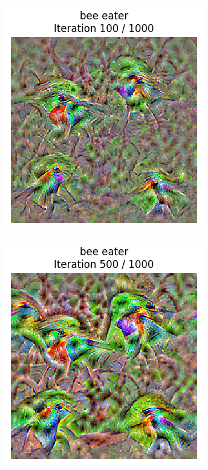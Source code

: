 \begin{figure}[H]
    \centering
    \begin{subfigure}[t]{.25\textwidth}
        \centering
        \includegraphics[width=\linewidth]{SqueezeNet/bird_animated_1000_regpp_blur_100_frame.png}
        \caption{}
        \label{fig:class_viz_iter:sub1}
    \end{subfigure}%
    \begin{subfigure}[t]{.25\textwidth}
        \centering
        \includegraphics[width=\linewidth]{SqueezeNet/bird_animated_1000_regpp_blur_500_frame.png}

\end{subfigure}
\end{figure}
